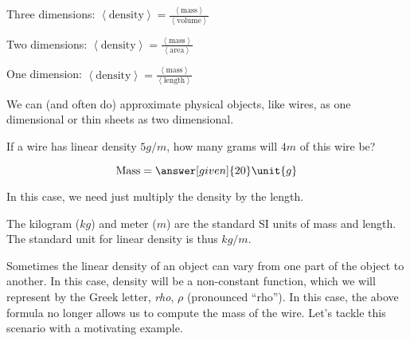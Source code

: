 \documentclass{ximera}
\begin{document}
Three dimensions: $\left<\textrm{density}\right> = \frac{\left<\textrm{mass}\right>}{\left<\textrm{volume}\right>}$

Two dimensions: $\left<\textrm{density}\right> = \frac{\left<\textrm{mass}\right>}{\left<\textrm{area}\right>}$

One dimension: $\left<\textrm{density}\right> = \frac{\left<\textrm{mass}\right>}{\left<\textrm{length}\right>}$

We can (and often do) approximate physical objects, like wires, as one dimensional or thin sheets as two dimensional. 

\begin{question}
  If a wire has linear density $5 \unit{g}/\unit{m}$, how many grams
  will $4 \unit{m}$ of this wire be?
  \begin{prompt}
  \[
  \mathrm{Mass} = \answer[given]{20} \unit{g}
  \]
  \end{prompt}
  \begin{hint}
    In this case, we need just multiply the density by the length.
  \end{hint}
\end{question}

\begin{fact}
The kilogram ($kg$) and meter ($m$) are the standard SI units of mass and length.  The standard unit for linear density is thus $kg/m$.
\end{fact}

Sometimes the linear density of an object can vary from one part of
the object to another. In this case, density will be a non-constant function, which we will represent by the Greek letter, \textit{rho}, $\rho$ (pronounced ``rho'').  In this case, the above formula no longer allows us to compute the mass of the wire.  Let's tackle this scenario with a motivating example.
\end{document}
